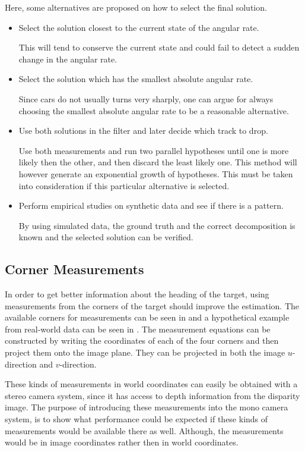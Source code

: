 Here, some alternatives are proposed on how to select the final solution.
%
\begin{itemize}
    \item Select the solution closest to the current state of the angular rate.

    This will tend to conserve the current state and could fail to detect a sudden change in the angular rate.

    \item Select the solution which has the smallest absolute angular rate.

    Since cars do not usually turns very sharply, one can argue for always choosing the smallest absolute angular rate to be a reasonable alternative.

    \item Use both solutions in the filter and later decide which track to drop.

    Use both measurements and run two parallel hypotheses until one is more likely then the other, and then discard the least likely one.
    This method will however generate an exponential growth of hypotheses.
    This must be taken into consideration if this particular alternative is selected.

    \item Perform empirical studies on synthetic data and see if there is a pattern.

    By using simulated data, the ground truth and the correct decomposition is known and the selected solution can be verified.
\end{itemize}

\subsection{Corner Measurements}
In order to get better information about the heading of the target, using measurements from the corners of the target should improve the estimation.
The available corners for measurements can be seen in  and a hypothetical example from real-world data can be seen in .
The measurement equations can be constructed by writing the  coordinates of each of the four corners and then project them onto the image plane.
They can be projected in both the image $u$-direction and $v$-direction.

These kinds of measurements in world coordinates can easily be obtained with a stereo camera system, since it has access to depth information from the disparity image.
The purpose of introducing these measurements into the mono camera system, is to show what performance could be expected if these kinds of measurements would be available there as well.
Although, the measurements would be in image coordinates rather then in world coordinates.

